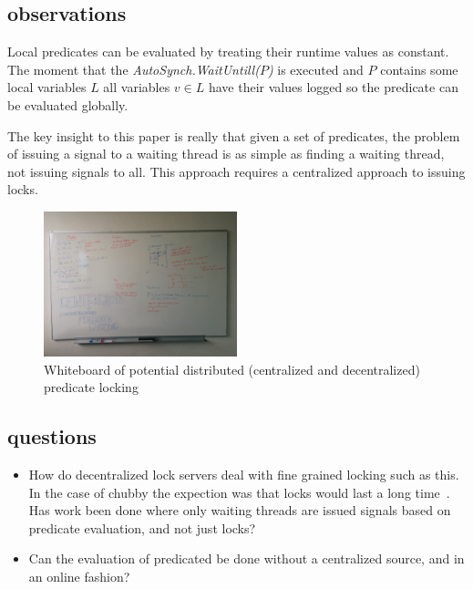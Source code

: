 \subsection{observations}

Local predicates can be evaluated by treating their runtime values as constant.
The moment that the \textit{AutoSynch.WaitUntill($P$)} is executed and $P$
contains some local variables $L$ all variables $v \in L$ have their values
logged so the predicate can be evaluated globally.

The key insight to this paper is really that given a set of predicates, the
problem of issuing a signal to a waiting thread is as simple as finding a
waiting thread, not issuing signals to all. This approach requires a
centralized approach to issuing locks.


\begin{figure}[t]
    \includegraphics[width=0.50\textwidth]{fig/predicatelock}

    \caption{Whiteboard of potential distributed (centralized and
    decentralized) predicate locking}

\label{fig:espace} 
\end{figure}

\subsection{questions}

\begin{itemize}

    \item How do decentralized lock servers deal with fine grained locking such
as this. In the case of chubby the expection was that locks would last a long
time~\cite{Burrows:2006:CLS:1298455.1298487}. Has work been done where only
waiting threads are issued signals based on predicate evaluation, and not just
locks?

    \item Can the evaluation of predicated be done without a centralized source, and in an online fashion?

\end{itemize}



